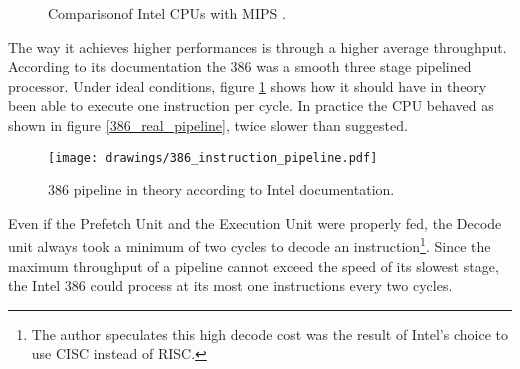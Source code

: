 \par
\begin{figure}[H]
\centering
   \caption{Comparison\protect\footnotemark of Intel CPUs with MIPS \protect\footnotemark.}
 \end{figure}

The way it achieves higher performances is through a higher average throughput. According to its documentation the 386 was a smooth three stage pipelined processor. Under ideal conditions, figure \ref{386_doc_pipeline} shows how it should have in theory been able to execute one instruction per cycle. In practice the CPU behaved as shown in figure \ref{386_real_pipeline}, twice slower than suggested.

\begin{figure}[H]
\centering
\texttt{[image: drawings/386\_instruction\_pipeline.pdf]}
\caption{386 pipeline in theory according to Intel documentation.}
\label{386_doc_pipeline}
\end{figure}



\par
Even if the Prefetch Unit and the Execution Unit were properly fed, the Decode unit always took a minimum of two cycles to decode an instruction\footnote{The author speculates this high decode cost was the result of Intel's choice to use CISC instead of RISC.}. Since the maximum throughput of a pipeline cannot exceed the speed of its slowest stage, the Intel 386 could process at its most one instructions every two cycles.\\
\par

